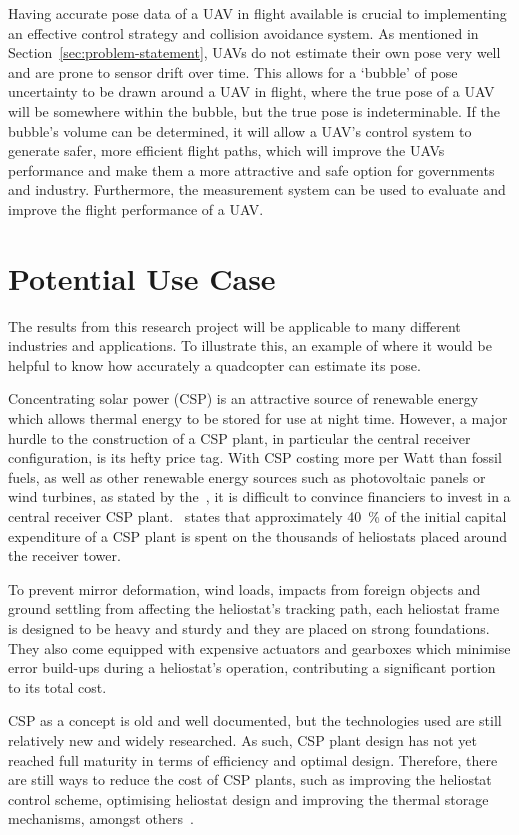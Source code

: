 Having accurate pose data of a UAV in flight available is crucial to implementing an effective control strategy and collision avoidance system. As mentioned in Section~\ref{sec:problem-statement}, UAVs do not estimate their own pose very well and are prone to sensor drift over time. This allows for a `bubble' of pose uncertainty to be drawn around a UAV in flight, where the true pose of a UAV will be somewhere within the bubble, but the true pose is indeterminable. If the bubble's volume can be determined, it will allow a UAV's control system to generate safer, more efficient flight paths, which will improve the UAVs performance and make them a more attractive and safe option for governments and industry. Furthermore, the measurement system can be used to evaluate and improve the flight performance of a UAV.\@ 

\section{Potential Use Case}

The results from this research project will be applicable to many different industries and applications. To illustrate this, an example of where it would be helpful to know how accurately a quadcopter can estimate its pose. 

Concentrating solar power (CSP) is an attractive source of renewable energy which allows thermal energy to be stored for use at night time. However, a major hurdle to the construction of a CSP plant, in particular the central receiver configuration, is its hefty price tag. With CSP costing more per Watt than fossil fuels, as well as other renewable energy sources such as photovoltaic panels or wind turbines, as stated by the~\cite{irena-renewable_cost}, it is difficult to convince financiers to invest in a central receiver CSP plant.~\cite{pitz2005ecostar} states that approximately 40~\% of the initial capital expenditure of a CSP plant is spent on the thousands of heliostats placed around the receiver tower. 

To prevent mirror deformation, wind loads, impacts from foreign objects and ground settling from affecting the heliostat's tracking path, each heliostat frame is designed to be heavy and sturdy and they are placed on strong foundations. They also come equipped with expensive actuators and gearboxes which minimise error build-ups during a heliostat's operation, contributing a significant portion to its total cost. 

CSP as a concept is old and well documented, but the technologies used are still relatively new and widely researched. As such, CSP plant design has not yet reached full maturity in terms of efficiency and optimal design. Therefore, there are still ways to reduce the cost of CSP plants, such as improving the heliostat control scheme, optimising heliostat design and improving the thermal storage mechanisms, amongst others~\citep{irena-cost_reduction}.  

